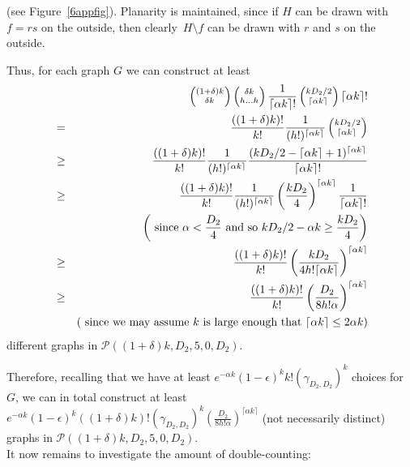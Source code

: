 \documentclass{article}
\newtheorem{Proof of Theorem}{Proof of Theorem}
\begin{document}
(see Figure~\ref{6appfig}).
Planarity is maintained,
since if $H$ can be drawn with $f=rs$ on the outside,
then clearly~$H \setminus f$ can be drawn with $r$ and $s$ on the outside.





Thus, for each graph $G$
we can construct at least
\begin{eqnarray*}
& & \left(^{(1+\delta)k} _{\phantom{qq} \delta k} \right)
\left(^{\phantom{p}\delta k}_{h \ldots h} \right) 
\frac{1}{\lceil \alpha k \rceil !} \left( ^{kD_{2}/2}_{\phantom{`}\lceil \alpha k \rceil} \right)
\lceil \alpha k \rceil ! \\
& = & \frac{((1+\delta)k)!}{k!} \frac{1}{(h!)^{\lceil \alpha k \rceil}} 
\left( ^{kD_{2}/2}_{\phantom{`}\lceil \alpha k \rceil} \right) \\
& \geq & \frac{((1+\delta)k)!}{k!} \frac{1}{(h!)^{\lceil \alpha k \rceil}}
\frac{(kD_{2}/2 - \lceil \alpha k \rceil +1)^{\lceil \alpha k \rceil}}{\lceil \alpha k \rceil !} \\
& \geq & \frac{((1+\delta)k)!}{k!} \frac{1}{(h!)^{\lceil \alpha k \rceil}} 
\left( \frac{kD_{2}}{4} \right)^{\lceil \alpha k \rceil} \frac{1}{\lceil \alpha k \rceil !} \\
& & \left( \textrm{ since } \alpha < \frac{D_{2}}{4}
\textrm{ and so } kD_{2}/2 - \alpha k \geq \frac{kD_{2}}{4} \right) \\
& \geq & \frac{((1+\delta)k)!}{k!} \left( \frac{kD_{2}}{4h! \lceil \alpha k \rceil} \right)^{\lceil \alpha k \rceil} \\
& \geq & \frac{((1+\delta)k)!}{k!} \left( \frac{D_{2}}{8h! \alpha} \right)^{\lceil \alpha k \rceil} \\
& & \left( \textrm{ since we may assume $k$ is large enough that } 
\lceil \alpha k \rceil \leq 2 \alpha k \right)
\end{eqnarray*}
different graphs in $\mathcal{P}((1+\delta)k,D_{2},5,0,D_{2})$.

Therefore, recalling that we have at least
$e^{-\alpha k} (1-\epsilon)^{k}k! \left( \gamma_{D_{2},D_{2}} \right)^{k}$
choices for~$G$,
we can in total construct at least
$
e^{-\alpha k} (1\!-\!\epsilon)^{k} ((1\!+\!\delta)k)! \left( \gamma_{D_{2},D_{2}} \right)^{k}
\left( \frac{D_{2}}{8h! \alpha} \right)^{\lceil \alpha k \rceil}
$
(not necessarily distinct) graphs in $\mathcal{P}((1+\delta)k,D_{2},5,0,D_{2})$. \\

It now remains to investigate the amount of double-counting: 
\end{document}
